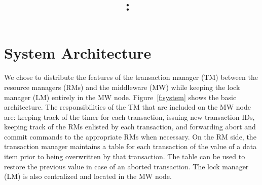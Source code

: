 \documentclass{article}
\title{
\vspace{2in}
\textmd{\textbf{\hmwkClass:\ \hmwkTitle}}\\
\vspace{3in}
}
\author{\textbf{\hmwkAuthorName}}
\date{} %
\begin{document}
\maketitle
\thispagestyle{empty}
\newpage
\setcounter{page}{1}



\section{System Architecture}

We chose to distribute the features of the transaction manager (TM) between the resource managers (RMs) and the middleware (MW) while keeping the lock manager (LM) entirely in the MW node. 
Figure~\ref{f:system} shows the basic architecture. 
The responsibilities of the TM that are included on the MW node are: keeping track of the timer for each transaction, issuing new transaction IDs, keeping track of the RMs enlisted by each transaction, and forwarding abort and commit commands to the appropriate RMs when necessary. 
On the RM side, the transaction manager maintains a table for each transaction of the value of a data item prior to being overwritten by that transaction. 
The table can be used to restore the previous value in case of an aborted transaction. 
The lock manager (LM) is also centralized and located in the MW node. 
\end{document}
